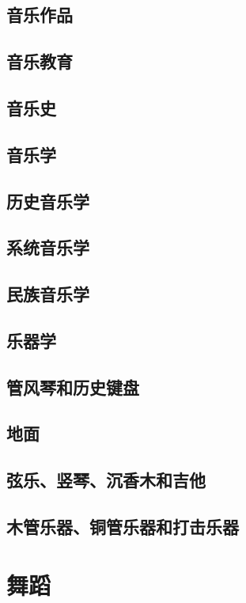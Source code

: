 \documentclass[UTF8]{../RepresentationUniverse}
\begin{document}
    \section{音乐作品}
    \section{音乐教育}
    \section{音乐史}
    \section{音乐学}
    \section{历史音乐学}
    \section{系统音乐学}
    \section{民族音乐学}



    \section{乐器学}
        \section{管风琴和历史键盘}
        \section{地面}
        \section{弦乐、竖琴、沉香木和吉他}
        \section{木管乐器、铜管乐器和打击乐器}







    
\chapter{舞蹈}
\end{document}
